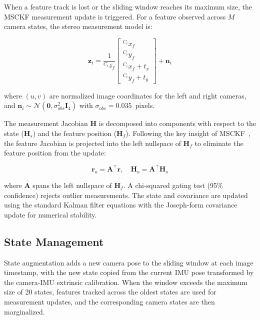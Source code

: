 \documentclass[conference]{IEEEtran}
\begin{document}
When a feature track is lost or the sliding window reaches its maximum size, the MSCKF measurement update is triggered. For a feature observed across $M$ camera states, the stereo measurement model is:

\begin{equation}
\mathbf{z}_i = \frac{1}{{}^{C_i}z_f} \begin{bmatrix} {}^{C_i}x_f \\ {}^{C_i}y_f \\ {}^{C_i}x_f + t_x \\ {}^{C_i}y_f + t_y \end{bmatrix}
+ \mathbf{n}_i
\end{equation}

\noindent where $(u, v)$ are normalized image coordinates for the left and right cameras, and $\mathbf{n}_i \sim \mathcal{N}(\mathbf{0}, \sigma_{obs}^2 \mathbf{I}_4)$ with $\sigma_{obs} = 0.035$~pixels.

The measurement Jacobian $\mathbf{H}$ is decomposed into components with respect to the state ($\mathbf{H}_s$) and the feature position ($\mathbf{H}_f$). Following the key insight of MSCKF~\cite{mourikis2007}, the feature Jacobian is projected into the left nullspace of $\mathbf{H}_f$ to eliminate the feature position from the update:

\begin{equation}
\mathbf{r}_o = \mathbf{A}^\top \mathbf{r}, \quad \mathbf{H}_o = \mathbf{A}^\top \mathbf{H}_s
\end{equation}

\noindent where $\mathbf{A}$ spans the left nullspace of $\mathbf{H}_f$. A chi-squared gating test (95\% confidence) rejects outlier measurements. The state and covariance are updated using the standard Kalman filter equations with the Joseph-form covariance update for numerical stability.

\subsection{State Management}

State augmentation adds a new camera pose to the sliding window at each image timestamp, with the new state copied from the current IMU pose transformed by the camera-IMU extrinsic calibration. When the window exceeds the maximum size of 20 states, features tracked across the oldest states are used for measurement updates, and the corresponding camera states are then marginalized.
\end{document}
